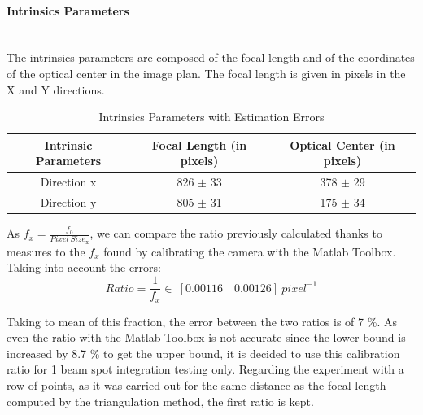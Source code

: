 \paragraph*{Intrinsics Parameters}
~\\
The intrinsics parameters are composed of the focal length and of the coordinates of the optical center in the image plan. The focal length is given in pixels in the X and Y directions. 

\begin{table}[H]
\centering
\caption{Intrinsics Parameters with Estimation Errors}
\label{intrisicsPara}
\renewcommand{\arraystretch}{1.5}
\begin{tabular}{|c|c|c|}
\hline
Intrinsic Parameters & Focal Length (in pixels) & Optical Center (in pixels)\\ \hline
Direction x & 826 $\pm$ 33 & 378 $\pm$ 29 \\ \hline
Direction y &  805 $\pm$ 31 & 175 $\pm$ 34 \\ 
\hline
\end{tabular}
\end{table}

As $f_x = \frac{f_0}{Pixel \ Size_{\text{x}}}$, we can compare the ratio previously calculated thanks to measures to the $f_x$ found by calibrating the camera with the Matlab Toolbox. Taking into account the errors:
\begin{equation*}
Ratio = \frac{1}{f_x} \in \ [0.00116 \quad 0.00126] \ pixel^{-1}
\end{equation*}

Taking to mean of this fraction, the error between the two ratios is of 7 \%. As even the ratio with the Matlab Toolbox is not accurate since the lower bound is increased by 8.7 \% to get the upper bound, it is decided to use this calibration ratio for 1 beam spot integration testing only. Regarding the experiment with a row of points, as it was carried out for the same distance as the focal length computed by the triangulation method, the first ratio is kept. 


